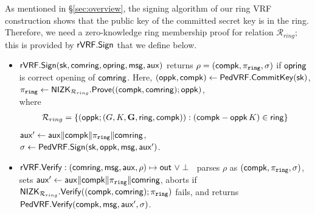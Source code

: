 	As mentioned in \S\ref{sec:overview}, the signing algorithm of our ring VRF construction shows that the public key of the committed secret key is in the ring. Therefore, we need a zero-knowledge ring membership proof for relation $ \mathcal{R}_{ring} $; this is provided by $ \rVRF.\Sign $ that we define below.
%	
	
	\def\tmpaux{\aux \doubleplus \compk \doubleplus \piring \doubleplus \comring}
	\def\tmpeprintaux{\eprint{\aux'}{\tmpaux}}
	\def\tmpindent{\hspace*{5pt}}
	\begin{itemize}
		\item $\rVRF.\rSign\eprint{ : }{}(\sk,\comring, \openring,\msg,\aux)\eprint{ \mapsto \rho}{}$ returns $\rho = (\compk,\piring,\sigma)$ if $ \openring $ is correct opening of $ \comring $. Here, 
		\tmpindent $(\openpk,\compk) \leftarrow \PedVRF.\CommitKey(\sk)$,  \\
		\tmpindent $\piring \leftarrow \NIZK_{\mathcal{R}_{ring}}.\Prove((\compk,\comring); \openpk)$, \\
		where 
		\begin{align}
				\mathcal{R}_{ring} = \{(\openpk;(\genG,\genB,\grE,\ring, \compk)): (\compk-\openpk \, \genB)  \in \ring\} \label{rel:snark} \nonumber
			\end{align}
		\tmpindent $\aux' \leftarrow \tmpaux$,  \\
		\tmpindent $\sigma \leftarrow \PedVRF.\Sign(\sk,\openpk,\msg, \aux')$.
		\item $\rVRF.\rVerify : (\comring,\msg,\aux,\rho) \mapsto \Out \,\, \lor \perp$ \,
		parses $\rho$ as $(\compk,\piring,\sigma)$, sets $\aux' \leftarrow \tmpaux$,
		aborts if $\NIZK_{\mathcal{R}_{ring}}.\Verify((\compk,\comring); \piring)$ fails,
		and returns $\PedVRF.\Verify(\compk,\msg, \aux', \sigma)$.
	\end{itemize}
	





